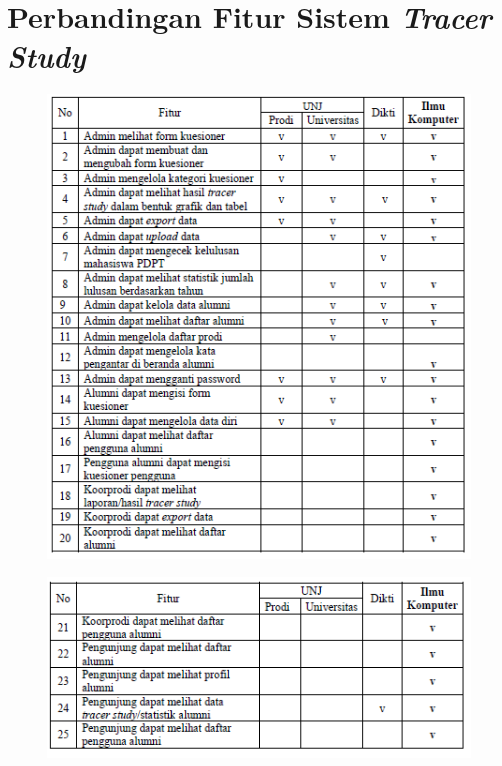 \appendix 
\chapter{Perbandingan Fitur Sistem \textit{Tracer Study}}

\begin{figure}[H]
	\centering
	\includegraphics[width=1.0\textwidth]{gambar/tabelFitur}
	\label{tabelFitur}
\end{figure}

\begin{figure}[H]
	\centering
	\includegraphics[width=1.0\textwidth]{gambar/tabelFitur2}
	\label{tabelFitur2}
\end{figure}

